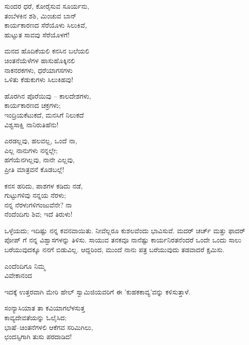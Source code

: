 \begin{myquote}
ಸುಂದರ ಧರೆ, ಕೋರೈಸುವ ಸೂರ್ಯನು,\\ತಂಬೆಳಕಿನ ಶಶಿ, ಮಿಂಚುವ ಬಾನ್\\ಕಾರ್ಯಕಾರಣದ ಸೆರೆಯೊಳು ಸಿಲುಕಿವೆ,\\ಹುಟ್ಟುತ ಸಾವವು ಸೆರೆಯೊಳಗೆ!
\end{myquote}

\begin{myquote}
ಮನದ ಹೊದಿಕೆಯಲಿ ಕನಸಿನ ಬಲೆಯಲಿ\\ಚಿಂತನೆಯೆಳೆಗಳ ಹಾಸುಹೊಕ್ಕಿನಲಿ\\ನಾಕನರಕಗಳು, ಧರೆಯಾಗಸಗಳು\\ಒಳಿತು ಕೆಡುಕುಗಳು ಸಿಲುಕಿಹವು!
\end{myquote}

\begin{myquote}
ಹೊರಗಿನ ಪೊರೆಯಿವು – ಕಾಲದೇಶಗಳು,\\ಕಾರ್ಯಕಾರಣದ ಚಕ್ರಗಳು;\\ಇಂದ್ರಿಯಕೆಟುಕದೆ, ಮನಸಿಗೆ ನಿಲುಕದೆ\\ವಿಶ್ವಸಾಕ್ಷಿ ನಾನಿರುತಿಹೆನು!
\end{myquote}

\begin{myquote}
ಎರಡಲ್ಲವು, ಹಲವಲ್ಲ, ಒಂದೆ ನಾ,\\ಎಲ್ಲ ನಾನುಗಳು ನನ್ನಲ್ಲೇ;\\ಹಗೆಯೆನಗಿಲ್ಲವು, ನಾನೇ ಎಲ್ಲವು,\\ಪ್ರೀತಿ ಮಾತ್ರವನೆ ಕೊಡಬಲ್ಲೆ!
\end{myquote}

\begin{myquote}
ಕನಸ ಹರಿದು, ಪಾಶಗಳ ಕಡಿದು ನಡೆ,\\ಗುಟ್ಟುಗಳಿವು ನನ್ನಯ ನೆರಳು;\\ನನ್ನ ನೆರಳುಗಳಿಗಂಜುವೆನೇ? ನಾ\\ನೆಂದೆಂದಿಗು ಶಿವ; ಇದೆ ತಿರುಳು!
\end{myquote}

ಒಳ್ಳೆಯದು; ಇದಿಷ್ಟು ನನ್ನ ಕವನವಾಯಿತು. ನೀವೆಲ್ಲರೂ ಕುಶಲವೆಂದು ಭಾವಿಸುವೆ. ಮದರ್ ಚರ್ಚ್ ಮತ್ತು ಫಾದರ್ ಪೋಪ್ ಗೆ ನನ್ನ ವಿಶ್ವಾಸಗಳನ್ನು ತಿಳಿಸು. ಸಾಯುವ ತನಕವೂ ನಾನೆಷ್ಟು ಕಾರ್ಯನಿರತನೆಂದರೆ ಒಂದೇ ಒಂದು ಸಾಲು ಬರೆಯುವುದಕ್ಕೂ ನನಗೆ ಬಿಡುವಿಲ್ಲ. ಆದ್ದರಿಂದ, ಮುಂದೆ ನಾನು ಪತ್ರ ಬರೆಯುವುದು ತಡವಾದರೆ ಕ್ಷಮಿಸು.

\begin{flushright}
ಎಂದೆಂದಿಗೂ ನಿಮ್ಮ\\ವಿವೇಕಾನಂದ
\end{flushright}

ಇದಕ್ಕೆ ಉತ್ತರವಾಗಿ ಮೇರಿ ಹೇಲ್ ಸ್ವಾಮಿಜಿಯವರಿಗೆ ಈ 'ಕುಹಕಕಾವ್ಯ'ವನ್ನು ಕಳಿಸುತ್ತಾಳೆ.

\begin{myquote}
ಸಂನ್ಯಾಸಿಯಾತ ತಾ ಕವಿಯಾಗಲೆಳಸುತ್ತ\\ಕಾವ್ಯದೇವತೆಯನ್ನು ಓಲೈಸಿದ;\\ಭಾಷೆ–ಚಿಂತನೆಗಳಲಿ ಆಕೆಗವ ಸರಿಮಿಗಿಲು,\\ಛಂದಸ್ಸಿಗಾಗಿ ತುಸು ಪರದಾಡಿದ!
\end{myquote}

